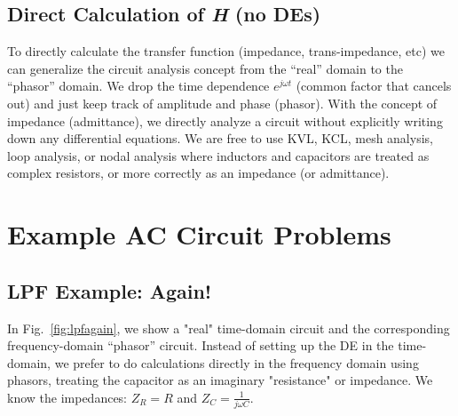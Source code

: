 
\subsection{Direct Calculation of \textit{H} (no DEs)}

To directly calculate the transfer function (impedance, trans-impedance, etc) we can generalize the circuit analysis concept from the “real” domain to the “phasor” domain.   We drop the time dependence $e^{j\omega t}$ (common factor that cancels out) and just keep track of amplitude and phase (phasor).  With the concept of impedance (admittance), we directly analyze a circuit without explicitly writing down any differential equations.  We are free to use KVL, KCL, mesh analysis, loop analysis, or nodal analysis where inductors and capacitors are treated as complex resistors, or more correctly as an impedance (or admittance).



\section{Example AC Circuit Problems}






\subsection{LPF Example: Again!}

In Fig.~\ref{fig:lpfagain}, we show a "real"  time-domain circuit and the corresponding frequency-domain “phasor” circuit.   Instead of setting up the DE in the time-domain, we prefer to do calculations directly in the frequency domain using phasors, treating the capacitor as an imaginary "resistance" or impedance.     We know the impedances: ${Z_R} = R $ and $ {Z_C} = \frac{1}{{j\omega C}}$.



